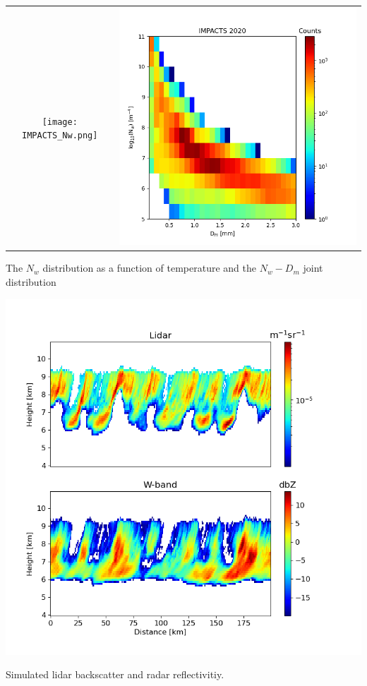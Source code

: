 \documentclass[final,t]{beamer}
\begin{document}
\begin{frame}
\begin{columns}[]
\begin{column}{.32\linewidth}
\begin{table}[ht]
\centering
\begin{tabular}{cc}
\texttt{[image: IMPACTS\_Nw.png]}&\includegraphics[scale=0.85]{IMPACTS_Nw_dm.png}\\

\end{tabular}
\end{table}
\centerline{The $N_w$ distribution as a function of temperature and the $N_w-D_m$ joint
distribution}

\centerline{\includegraphics[scale=0.95]{radarAndLidar_slice.png}}
\centerline{Simulated lidar backscatter and radar reflectivitiy.}


\end{column}
\end{columns}
\end{frame}
\end{document}
